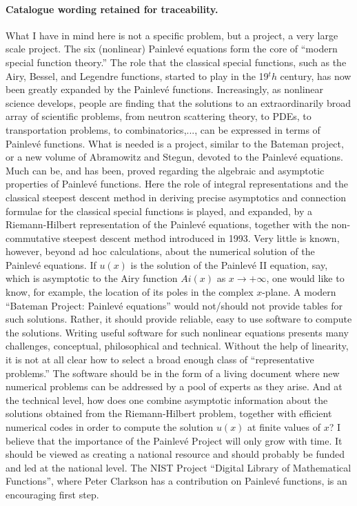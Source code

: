 \documentclass[11pt]{article}
\begin{document}
\paragraph{Catalogue wording retained for traceability.}
What I have in mind here is not a specific problem, but a project, a very large scale project. The six (nonlinear) Painlev\'e equations form the core of ``modern special function theory.'' The role that the classical special functions, such as the Airy, Bessel, and Legendre functions, started to play in the 19$^th$ century, has now been greatly expanded by the Painlev\'e functions. Increasingly, as nonlinear science develops, people are finding that the solutions to an extraordinarily broad array of scientific problems, from neutron scattering theory, to PDEs, to transportation problems, to combinatorics,..., can be expressed in terms of Painlev\'e functions. What is needed is a project, similar to the Bateman project, or a new volume of Abramowitz and Stegun, devoted to the Painlev\'e equations. Much can be, and has been, proved regarding the algebraic and asymptotic properties of Painlev\'e functions. Here the role of integral representations and the classical steepest descent method in deriving precise asymptotics and connection formulae for the classical special functions is played, and expanded, by a Riemann-Hilbert representation of the Painlev\'e equations, together with the non-commutative steepest descent method introduced in 1993. Very little is known, however, beyond ad hoc calculations, about the numerical solution of the Painlev\'e equations. If $u(x)$ is the solution of the Painlev\'e II equation, say, which is asymptotic to the Airy function $Ai(x)$ as $x\to+\infty$, one would like to know, for example, the location of its poles in the complex $x$-plane. A modern ``Bateman Project: Painlev\'e equations'' would not/should not provide tables for such solutions. Rather, it should provide reliable, easy to use software to compute the solutions. Writing useful software for such nonlinear equations presents many challenges, conceptual, philosophical and technical. Without the help of linearity, it is not at all clear how to select a broad enough class of ``representative problems.'' The software should be in the form of a living document where new numerical problems can be addressed by a pool of experts as they arise. And at the technical level, how does one combine asymptotic information about the solutions obtained from the Riemann-Hilbert problem, together with efficient numerical codes in order to compute the solution $u(x)$ at finite values of $x$? I believe that the importance of the Painlev\'e Project will only grow with time. It should be viewed as creating a national resource and should probably be funded and led at the national level. The NIST Project ``Digital Library of Mathematical Functions'', where Peter Clarkson has a contribution on Painlev\'e functions, is an encouraging first step.
\end{document}
